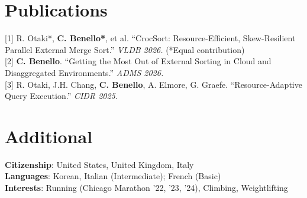 \documentclass[letterpaper,10pt]{article}
\begin{document}
\section{Publications}
 \begin{itemize}[leftmargin=0.015in, label={}]
    \small{\item{
     {[1] R. Otaki*, \textbf{C. Benello*}, et al. ``CrocSort: Resource-Efficient, Skew-Resilient Parallel External Merge Sort.'' \textit{VLDB 2026.} (*Equal contribution)} \\
     {[2] \textbf{C. Benello}. ``Getting the Most Out of External Sorting in Cloud and Disaggregated Environments.'' \textit{ADMS 2026.}} \\
     {[3] R. Otaki, J.H. Chang, \textbf{C. Benello}, A. Elmore, G. Graefe. ``Resource-Adaptive Query Execution.'' \textit{CIDR 2025.}}
    }}
 \end{itemize}\vspace{-9pt}

\section{Additional}
 \begin{itemize}[leftmargin=0.015in, label={}]
    \small{\item{
     \textbf{Citizenship}{: United States, United Kingdom, Italy} \\
     \textbf{Languages}{: Korean, Italian (Intermediate); French (Basic)} \\
     \textbf{Interests}{: Running (Chicago Marathon '22, '23, '24), Climbing, Weightlifting}
    }}
 \end{itemize}
\end{document}
